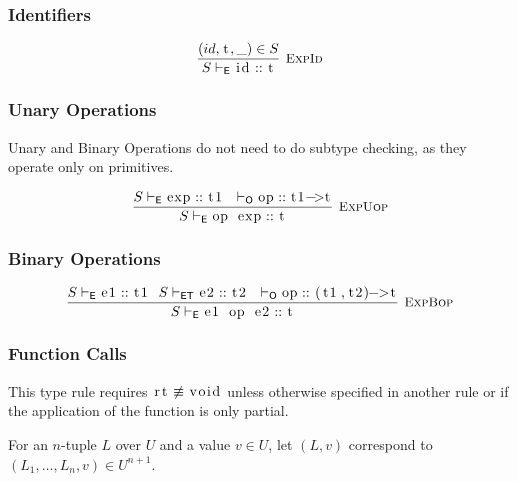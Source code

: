 \documentclass{article}
\newcommand{\code}[1]{\lstinline[columns=fixed]{#1}}
\newcommand{\drmrule}[5]{\frac{#1}{#2\vdash_{\mathsf{#3}}#4}\textsc{\ \small{#5}}}
\newcommand{\ruleapp}[1]{\vdash_{\mathsf{#1}}}
\newcommand{\mc}[1]{\textnormal{\code{#1}}}
\begin{document}
			\subsubsection{Identifiers}
			
				\begin{align*}
					\drmrule{(id,\mc{t},\_)\in S}{S}{E}{\mc{id} :: \mc{t}}{ExpId}
				\end{align*}
			
			\subsubsection{Unary Operations}
			
				Unary and Binary Operations do not need to do subtype checking, as they operate only on primitives.
			
				\begin{align*}
					\drmrule{S\ruleapp{E}\mc{exp}::\mc{t1}\ \ \ruleapp{O}\mc{op}::\mc{t1->t}}{S}{E}{\mc{op exp}::\mc{t}}{ExpUop}
				\end{align*}
			
			\subsubsection{Binary Operations}
			
				\begin{align*}
					\drmrule{S\ruleapp{E}\mc{e1}::\mc{t1}\ \ S\ruleapp{ET}\mc{e2}::\mc{t2}\ \ \ruleapp{O}\mc{op}::\mc{(t1,t2)->t}}{S}{E}{\mc{e1 op e2} :: \mc{t}}{ExpBop}
				\end{align*}
			
			\subsubsection{Function Calls}
			
				This type rule requires $\mc{rt}\not\equiv\mc{void}$ unless otherwise specified in another rule or if the application of the function is only partial.
				
				For an $n$-tuple $L$ over $U$ and a value $v\in U$, let $(L,v)$ correspond to $(L_1,\dots,L_n,v)\in U^{n+1}$.
			
\end{document}
